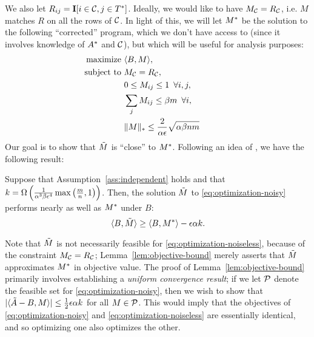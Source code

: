 We also let $R_{ij} = \mathbf{I}[i \in \mathcal{C}, j \in T^*]$.
Ideally, we would like to have $M_{\mathcal{C}} = R_{\mathcal{C}}$, i.e. $M$ matches $R$ on 
all the rows of $\mathcal{C}$. In light of this, 
we will let $M^*$ be the solution to the following ``corrected'' program, which 
we don't have access to (since it involves knowledge of $A^*$ and $\mathcal{C}$), 
but which will be useful for analysis purposes:
\begin{align}
\label{eq:optimization-noiseless}
\text{maximize } &\langle B, M \rangle, \\
\notag \text{ subject to } &M_{\mathcal{C}} = R_{\mathcal{C}}, \\
\notag  &0 \leq M_{ij} \leq 1 \,\,\, \forall i,j,  \\
\notag  &\sum_j M_{ij} \leq \beta m \,\,\, \forall i, \\
\notag  &\|M\|_* \leq \frac{2}{\alpha\epsilon}\sqrt{\alpha\beta nm} \phantom{xxxxxxx}
\end{align}
Our goal is to show that $\tilde{M}$ is ``close'' to $M^*$. 
Following an idea of \citet{guedon2014community}, we have the following result:
\begin{lemma}
\label{lem:objective-bound}
Suppose that Assumption~\ref{ass:independent} holds and that 
$k = \Omega\left( \frac{1}{\alpha^3\beta\epsilon^4}\max\left( \frac{m}{n},1 \right) \right)$. 
Then, the solution $\tilde{M}$ to \eqref{eq:optimization-noisy} performs nearly as 
well as $M^*$ under $B$:
\begin{equation}
\label{eq:objective-bound}
\langle B, \tilde{M} \rangle \geq \langle B, M^* \rangle - \epsilon \alpha k.
\end{equation}
\end{lemma}
Note that $\tilde{M}$ is not necessarily feasible for \eqref{eq:optimization-noiseless}, 
because of the constraint $M_{\mathcal{C}} = R_{\mathcal{C}}$; Lemma~\ref{lem:objective-bound} 
merely asserts that $\tilde{M}$ approximates $M^*$ in objective value. The proof of 
Lemma~\ref{lem:objective-bound} primarily involves establishing a 
\emph{uniform convergence result}; if we let $\mathcal{P}$ denote the feasible set for 
\eqref{eq:optimization-noisy}, then we wish to show that 
$|\langle \tilde{A} - B, M \rangle| \leq \frac{1}{2}\epsilon \alpha k$ for all 
$M \in \mathcal{P}$. This would imply that the objectives of 
\eqref{eq:optimization-noisy} and \eqref{eq:optimization-noiseless} are 
essentially identical, and so optimizing one also optimizes the other.

